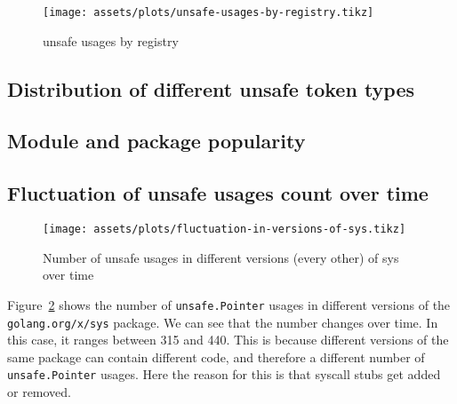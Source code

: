 \begin{figure}[ht]
    \begin{center}
    {\scriptsize \texttt{[image: assets/plots/unsafe-usages-by-registry.tikz]}}
    \end{center}
    \caption{unsafe usages by registry}
    \label{fig:unsafe-usages-by-registry}
\end{figure}



\subsection{Distribution of different unsafe token types}\label{subsec:results-tokens}



\subsection{Module and package popularity}\label{subsec:results-popularity}



\subsection{Fluctuation of unsafe usages count over time}\label{subsec:results-time-change}

\begin{figure}[ht]
    \begin{center}
    {\scriptsize \texttt{[image: assets/plots/fluctuation-in-versions-of-sys.tikz]}}
    \end{center}
    \caption{Number of unsafe usages in different versions (every other) of sys over time}
    \label{fig:fluctuation-in-versions-of-sys}
\end{figure}

Figure~\ref{fig:fluctuation-in-versions-of-sys} shows the number of \texttt{unsafe.Pointer} usages in different versions
of the \texttt{golang.org/x/sys} package.
We can see that the number changes over time.
In this case, it ranges between 315 and 440.
This is because different versions of the same package can contain different code, and therefore a different number of
\texttt{unsafe.Pointer} usages.
Here the reason for this is that syscall stubs get added or removed.

